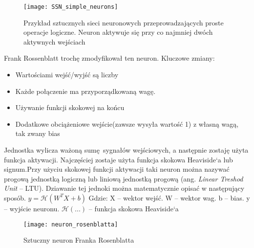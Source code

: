 \documentclass{article}
\begin{document}
\clearpage
	
\begin{figure}
	\centering
	\texttt{[image: SSN\_simple\_neurons]}
	\caption{
		Przykład sztucznych sieci neuronowych przeprowadzających proste operacje logiczne. Neuron aktywuje się przy co najmniej dwóch aktywnych wejściach \cite{geron}
	}
\end{figure}

Frank Rossenblatt trochę zmodyfikował ten neuron.\newline
Kluczowe zmiany:
\begin{itemize}
	\item Wartościami wejść/wyjść są liczby
	\item Każde połączenie ma przyporządkowaną wagę.
	\item Używanie funkcji skokowej na końcu
	\item Dodatkowe obciążeniowe wejście(zawsze wysyła wartość 1) z własną wagą, tak zwany bias
\end{itemize}
Jednostka wylicza ważoną sumę sygnałów wejściowych, a następnie zostaję użyta funkcja aktywacji. Najczęściej zostaje użyta funkcja skokowa Heaviside`a lub signum.Przy użyciu skokowej funkcji aktywacji taki neuron można nazywać progową jednostką logiczną lub liniową jednostką progową (ang. \textit{Linear Treshod Unit} -- LTU). Dziawanie tej jednoki można matematycznie opisać w następujący sposób.\newline\newline
$ y = \mathcal{H}(W^{T}X + b) $\newline \newline
Gdzie: \newline
X -- wektor wejść. \newline
W -- wektor wag. \newline
b -- bias. \newline
y -- wyjście neuronu. \newline
$ \mathcal{H}(...) $ -- funkcja skokowa Heaviside`a\newline

\begin{figure}[!ht]
	\centering
	\texttt{[image: neuron\_rosenblatta]}
	\caption{
		Sztuczny neuron Franka Rosenblatta
	}
\end{figure}


\end{document}

